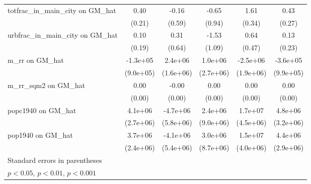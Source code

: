 \begin{table}[htbp]
\begin{tabular}{l*{5}{c}}
\addlinespace
totfrac\_in\_main\_city on GM\_hat&     0.40         &    -0.16         &    -0.65         &     1.61\sym{***}&     0.43         \\
                &   (0.21)         &   (0.59)         &   (0.94)         &   (0.34)         &   (0.27)         \\
\addlinespace
urbfrac\_in\_main\_city on GM\_hat&     0.10         &     0.31         &    -1.53         &     0.64         &     0.13         \\
                &   (0.19)         &   (0.64)         &   (1.09)         &   (0.47)         &   (0.23)         \\
\addlinespace
m\_rr on GM\_hat  & -1.3e+05         &  2.4e+06         &  1.0e+06         & -2.5e+06         & -3.6e+05         \\
                &(9.0e+05)         &(1.6e+06)         &(2.7e+06)         &(1.9e+06)         &(9.9e+05)         \\
\addlinespace
m\_rr\_sqm2 on GM\_hat&     0.00         &    -0.00         &     0.00         &     0.00         &     0.00         \\
                &   (0.00)         &   (0.00)         &   (0.00)         &   (0.00)         &   (0.00)         \\
\addlinespace
popc1940 on GM\_hat&  4.1e+06         & -4.7e+06         &  2.4e+06         &  1.7e+07\sym{***}&  4.8e+06         \\
                &(2.7e+06)         &(5.8e+06)         &(9.0e+06)         &(4.5e+06)         &(3.2e+06)         \\
\addlinespace
pop1940 on GM\_hat&  3.7e+06         & -4.1e+06         &  3.0e+06         &  1.5e+07\sym{***}&  4.4e+06         \\
                &(2.4e+06)         &(5.4e+06)         &(8.7e+06)         &(4.0e+06)         &(2.9e+06)         \\
\bottomrule
\multicolumn{6}{l}{\footnotesize Standard errors in parentheses}\\
\multicolumn{6}{l}{\footnotesize \sym{*} \(p<0.05\), \sym{**} \(p<0.01\), \sym{***} \(p<0.001\)}\\
\end{tabular}
\end{table}
